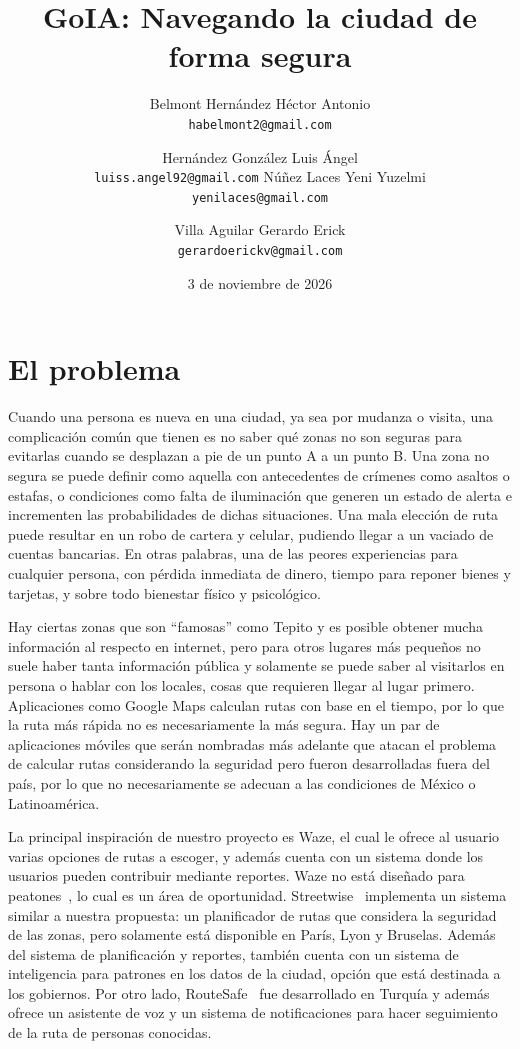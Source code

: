 \documentclass[11pt]{article}
\title{GoIA: Navegando la ciudad de forma segura}
\author{%
  Belmont Hernández Héctor Antonio\\ {\small\texttt{habelmont2@gmail.com}}
  \and
  Hernández González Luis Ángel\\ {\small\texttt{luiss.angel92@gmail.com}}
  \otrorenglon
  Núñez Laces Yeni Yuzelmi\\ {\small\texttt{yenilaces@gmail.com}}
  \and
  Villa Aguilar Gerardo Erick\\ {\small\texttt{gerardoerickv@gmail.com}}
}
\date{3 de noviembre de 2026}
\begin{document}
\maketitle
\thispagestyle{empty}

\section{El problema}
\label{sec:problema}

Cuando una persona es nueva en una ciudad, ya sea por mudanza o visita, una complicación común que
tienen es no saber qué zonas no son seguras para evitarlas cuando se desplazan a pie de un punto A a
un punto B. Una zona no segura se puede definir como aquella con antecedentes de crímenes como
asaltos o estafas, o condiciones como falta de iluminación que generen un estado de alerta e
incrementen las probabilidades de dichas situaciones. Una mala elección de ruta puede resultar en un
robo de cartera y celular, pudiendo llegar a un vaciado de cuentas bancarias. En otras palabras, una
de las peores experiencias para cualquier persona, con pérdida inmediata de dinero, tiempo para
reponer bienes y tarjetas, y sobre todo bienestar físico y psicológico.

Hay ciertas zonas que son ``famosas'' como Tepito y es posible obtener mucha información al respecto
en internet, pero para otros lugares más pequeños no suele haber tanta información pública y
solamente se puede saber al visitarlos en persona o hablar con los locales, cosas que requieren
llegar al lugar primero. Aplicaciones como Google Maps calculan rutas con base en el tiempo, por lo
que la ruta más rápida no es necesariamente la más segura. Hay un par de aplicaciones móviles que
serán nombradas más adelante que atacan el problema de calcular rutas considerando la seguridad pero
fueron desarrolladas fuera del país, por lo que no necesariamente se adecuan a las condiciones de
México o Latinoamérica.

La principal inspiración de nuestro proyecto es Waze, el cual le ofrece al usuario varias opciones de
rutas a escoger, y además cuenta con un sistema donde los usuarios pueden contribuir mediante
reportes. Waze no está diseñado para peatones~\cite{waze}, lo cual es un área de oportunidad.
Streetwise~\cite{streetwise} implementa un sistema similar a nuestra propuesta: un planificador de
rutas que considera la seguridad de las zonas, pero solamente está disponible en París, Lyon y
Bruselas. Además del sistema de planificación y reportes, también cuenta con un sistema de
inteligencia para patrones en los datos de la ciudad, opción que está destinada a los gobiernos.
Por otro lado, RouteSafe~\cite{routesafe} fue desarrollado en Turquía y además ofrece un asistente de
voz y un sistema de notificaciones para hacer seguimiento de la ruta de personas conocidas.
\end{document}
